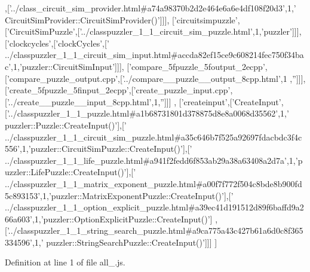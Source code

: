 \begin{DoxyCode}
      ,[\textcolor{stringliteral}{'../class\_circuit\_sim\_provider.html#a74a98370b2d2e464e6a6e4df108f20d3'},1,\textcolor{stringliteral}{'
      CircuitSimProvider::CircuitSimProvider()'}]]],
  [\textcolor{stringliteral}{'circuitsimpuzzle'},[\textcolor{stringliteral}{'CircuitSimPuzzle'},[\textcolor{stringliteral}{'../classpuzzler\_1\_1\_circuit\_sim\_puzzle.html'},1,\textcolor{stringliteral}{'puzzler'}]]],
  [\textcolor{stringliteral}{'clockcycles'},[\textcolor{stringliteral}{'clockCycles'},[\textcolor{stringliteral}{'
      ../classpuzzler\_1\_1\_circuit\_sim\_input.html#accda82ef15ce9c608214fec750f34bac'},1,\textcolor{stringliteral}{'puzzler::CircuitSimInput'}]]],
  [\textcolor{stringliteral}{'compare\_5fpuzzle\_5foutput\_2ecpp'},[\textcolor{stringliteral}{'compare\_puzzle\_output.cpp'},[\textcolor{stringliteral}{'../compare\_\_puzzle\_\_output\_8cpp.html'},1
      ,\textcolor{stringliteral}{''}]]],
  [\textcolor{stringliteral}{'create\_5fpuzzle\_5finput\_2ecpp'},[\textcolor{stringliteral}{'create\_puzzle\_input.cpp'},[\textcolor{stringliteral}{'../create\_\_puzzle\_\_input\_8cpp.html'},1,\textcolor{stringliteral}{''}]]]
      ,
  [\textcolor{stringliteral}{'createinput'},[\textcolor{stringliteral}{'CreateInput'},[\textcolor{stringliteral}{'../classpuzzler\_1\_1\_puzzle.html#a1b68731801d378875d8e8a0068d35562'},1,\textcolor{stringliteral}{'
      puzzler::Puzzle::CreateInput()'}],[\textcolor{stringliteral}{'
      ../classpuzzler\_1\_1\_circuit\_sim\_puzzle.html#a35c646b7f525a92697fdacbdc3f4c556'},1,\textcolor{stringliteral}{'puzzler::CircuitSimPuzzle::CreateInput()'}],[\textcolor{stringliteral}{'
      ../classpuzzler\_1\_1\_life\_puzzle.html#a941f2fedd6f853ab29a38a63408a2d7a'},1,\textcolor{stringliteral}{'puzzler::LifePuzzle::CreateInput()'}],[\textcolor{stringliteral}{'
      ../classpuzzler\_1\_1\_matrix\_exponent\_puzzle.html#a00f7f772f504c8bde8b900fd5c893153'},1,\textcolor{stringliteral}{'puzzler::MatrixExponentPuzzle::CreateInput()'}],[\textcolor{stringliteral}{'
      ../classpuzzler\_1\_1\_option\_explicit\_puzzle.html#a39ec41d191512d89f6baffd9a266a603'},1,\textcolor{stringliteral}{'puzzler::OptionExplicitPuzzle::CreateInput()'}]
      ,[\textcolor{stringliteral}{'../classpuzzler\_1\_1\_string\_search\_puzzle.html#a9ca775a43c427b61a6d0c8f365334596'},1,\textcolor{stringliteral}{'
      puzzler::StringSearchPuzzle::CreateInput()'}]]]
]
\end{DoxyCode}


Definition at line 1 of file all\+\_.\+js.

